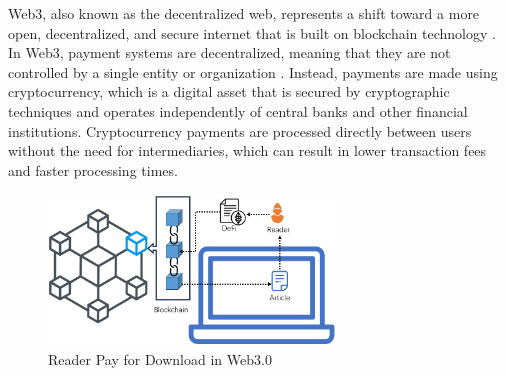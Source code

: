 \documentclass[lettersize,journal]{IEEEtran}
\begin{document}
Web3, also known as the decentralized web, represents a shift toward a more open, decentralized, and secure internet that is built on blockchain technology \cite{alabdulwahhab2018web}. In Web3, payment systems are decentralized, meaning that they are not controlled by a single entity or organization \cite{cao2022decentralized}. Instead, payments are made using cryptocurrency, which is a digital asset that is secured by cryptographic techniques and operates independently of central banks and other financial institutions. Cryptocurrency payments are processed directly between users without the need for intermediaries, which can result in lower transaction fees and faster processing times.

\begin{figure}[h]
  \centering
  \includegraphics[width=3in]{assets/web3.png}
  \caption{Reader Pay for Download in Web3.0}
  \label{fig:web3}
\end{figure}
\end{document}
